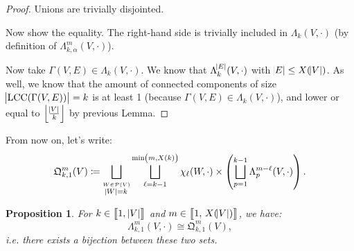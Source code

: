 \documentclass{article}
\newtheorem{proposition}[lemma]{Proposition}
\theoremstyle{definition}
\theoremstyle{remark}
\DeclareMathOperator{\LCC}{LCC}
\newcommand{\intint}[2]{\left\llbracket#1, \, #2\right\rrbracket}
\newcommand{\floor}[1]{\left\lfloor#1\right\rfloor}
\begin{document}
		\begin{proof} Unions are trivially disjointed.

		Now show the equality. The right-hand side is trivially included in $\Lambda_k(V, \cdot)$ (by definition of $\Lambda_{k,\alpha}^m(V, \cdot)$).

		Now take $\Gamma(V, E) \in \Lambda_k(V, \cdot)$. We know that $\Lambda_k^{\abs E}(V, \cdot)$ with $\abs E \leq X(\abs V)$. As well, we know that the amount
		of connected components of size $\abs {\LCC(\Gamma(V, E))} = k$ is at least 1 (because $\Gamma(V, E) \in \Lambda_k(V, \cdot)$), and lower or equal to
		$\floor {\frac {\abs V}k}$ by previous Lemma.
		\end{proof}

		From now on, let's write:
		\[\mathfrak Q_{k,1}^m(V) \coloneqq \bigsqcup_{\stackrel {W \in \mathcal P(V)}{\abs W = k}}\bigsqcup_{\ell=k-1}^{\min\left(m, X(k)\right)}
			\chi_\ell(W, \cdot) \times \left(\bigsqcup_{p=1}^{k-1}\Lambda_p^{m-\ell}(V, \cdot)\right).\]

		\begin{proposition} For $k \in \intint 1{\abs V}$ and $m \in \intint 1{X(\abs V)}$, we have:
		\[\Lambda_{k,1}^m(V, \cdot) \cong \mathfrak Q_{k,1}^m(V),\]
		i.e. there exists a bijection between these two sets.
		\end{proposition}
\end{document}
